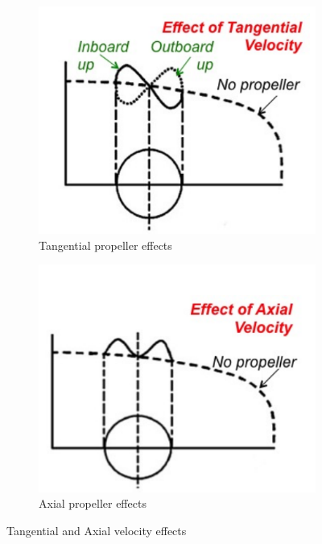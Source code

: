 \begin{figure}[H]
     \centering
     \begin{subfigure}[b]{0.4\textwidth}
         \centering
         \includegraphics[width=\textwidth]{03_LiteratureReview/Figs/tanget.png}
         \caption{Tangential propeller effects}
         \label{fig:2a}
     \end{subfigure}
     \hfill
     \begin{subfigure}[b]{0.4\textwidth}
         \centering
         \includegraphics[width=\textwidth]{03_LiteratureReview/Figs/axial.png}
         \caption{Axial propeller effects}
         \label{fig:2b}
     \end{subfigure}
     \hfill
        \caption{Tangential and Axial velocity effects \cite{Ferraro2014}}
        \label{fig:prop}
\end{figure}


